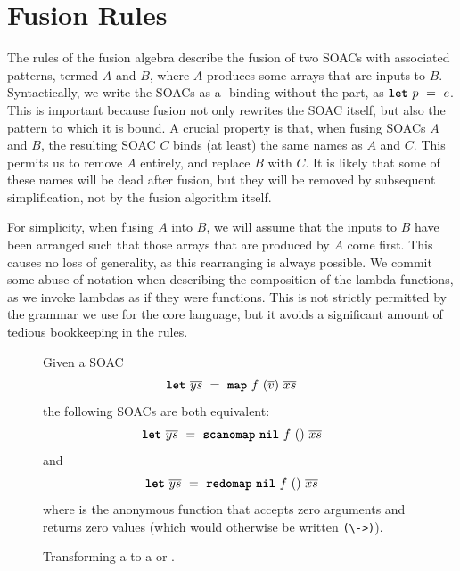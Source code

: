 \section{Fusion Rules}
\label{sec:fusionalgebra}

The rules of the fusion algebra describe the fusion of two SOACs with
associated patterns, termed $A$ and $B$, where $A$ produces some
arrays that are inputs to $B$.  Syntactically, we write the SOACs as a
-binding without the  part, as $\mbox{\texttt{\bfseries{let}}}~p~=~e$.  This
is important because fusion not only rewrites the SOAC itself, but
also the pattern to which it is bound.  A crucial property is that,
when fusing SOACs $A$ and $B$, the resulting SOAC $C$ binds (at least)
the same names as $A$ and $C$.  This permits us to remove $A$
entirely, and replace $B$ with $C$.  It is likely that some of these
names will be dead after fusion, but they will be removed by
subsequent simplification, not by the fusion algorithm itself.

For simplicity, when fusing $A$ into $B$, we will assume that the
inputs to $B$ have been arranged such that those arrays that are
produced by $A$ come first.  This causes no loss of generality, as
this rearranging is always possible.  We commit some abuse of notation
when describing the composition of the lambda functions, as we invoke
lambdas as if they were functions.  This is not strictly permitted by
the grammar we use for the core language, but it avoids a significant
amount of tedious bookkeeping in the rules.

\begin{figure}[bt]
  Given a SOAC
\[
  \mbox{\texttt{\bfseries{let}}}~\overline{ys}~=~\mbox{\texttt{\bfseries{map}}}~f~(\overline{v})~\overline{xs}
\]
the following SOACs are both equivalent:
\[
  \mbox{\texttt{\bfseries{let}}}~\overline{ys}~=~\mbox{\texttt{\bfseries{scanomap}}}~\mbox{\texttt{\bfseries{nil}}}~f~()~\overline{xs}
\]
and
\[
  \mbox{\texttt{\bfseries{let}}}~\overline{ys}~=~\mbox{\texttt{\bfseries{redomap}}}~\mbox{\texttt{\bfseries{nil}}}~f~()~\overline{xs}
\]
where  is the anonymous function that accepts zero arguments
and returns zero values (which would otherwise be written
\lstinline{(\->)}).
  \caption{Transforming a  to a  or .}
  \label{fig:map-to-scanomap-or-redomap}
\end{figure}

